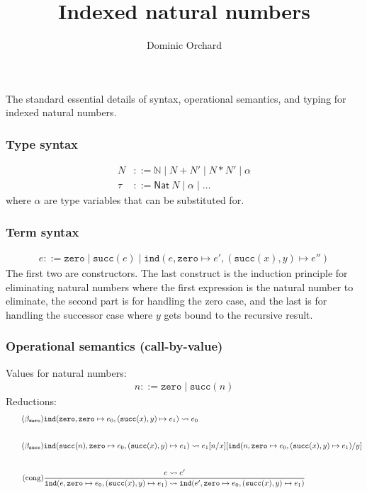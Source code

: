 \documentclass[10pt]{article}
\title{Indexed natural numbers}
\author{Dominic Orchard}
\newcommand{\ind}[5]{\texttt{ind}(#1, \texttt{zero} \mapsto #2, (\texttt{succ}(#3), #4) \mapsto #5)}
\begin{document}
\maketitle

\noindent
The standard essential details of syntax, operational semantics, and typing for indexed natural numbers.

\subsubsection*{Type syntax}
\begin{align}
\tag{type-level naturals}
N & ::= \mathbb{N} \mid N + N' \mid N * N' \mid \alpha \\
\tag{types} 
\tau & ::= \mathsf{Nat}\ N \mid \alpha \mid \ldots 
\end{align}
where $\alpha$ are type variables that can be substituted for.

\subsubsection*{Term syntax}
\begin{align*}
e ::= \texttt{zero} \mid \texttt{succ}(e) \mid \ind{e}{e'}{x}{y}{e''}
\end{align*}
The first two are constructors. The last construct is the induction principle for eliminating
natural numbers where the first expression is the natural number to eliminate,
the second part is for handling the zero case, and the last is for handling
the successor case where $y$ gets bound to the recursive result.

\subsubsection*{Operational semantics (call-by-value)}

Values for natural numbers:
\begin{align*}
n ::= \texttt{zero} \mid \texttt{succ}(n)
\end{align*}
%
Reductions:
\begin{align*}
\tag{$\beta_{\texttt{zero}}$}
& \ind{\texttt{zero}}{e_0}{x}{y}{e_1} \leadsto e_0
\\[2em]
\tag{$\beta_{\texttt{succ}}$}
& \ind{\texttt{succ}(n)}{e_0}{x}{y}{e_1} \leadsto e_1[n/x][\ind{n}{e_0}{x}{y}{e_1}/y]
\\[2em]
\tag{cong}
& \dfrac{e \leadsto e'}{\ind{e}{e_0}{x}{y}{e_1} \leadsto \ind{e'}{e_0}{x}{y}{e_1}}
\end{align*}
\end{document}
